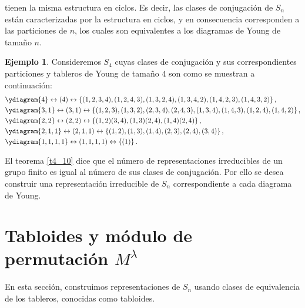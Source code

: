 \documentclass[12pt]{book}
\theoremstyle{definition}
\newtheorem{example}[theorem]{Ejemplo}
\newcounter{in}
\newcounter{ini}
\begin{document}
tienen la misma estructura en ciclos. Es decir, las clases de
conjugación de $S_{n}$ están caracterizadas por la estructura en
ciclos, y en consecuencia corresponden a las particiones de $n$, los
cuales son equivalentes a los diagramas de Young de tamaño $n$.
\begin{example}
Consideremos $S_{4}$ cuyas clases de conjugación y sus correspondientes particiones y tableros de Young de tamaño $4$ son como se muestran a continuación:
\begin{equation*}
\begin{aligned}
& \ydiagram{4}  \leftrightarrow  (4) \leftrightarrow  \left \{ (1,2,3,4),(1,2,4,3),(1,3,2,4),(1,3,4,2),(1,4,2,3),(1,4,3,2) \right \}, \\
& \ydiagram{3,1}  \leftrightarrow (3,1) \leftrightarrow  \left \{ (1,2,3),(1,3,2),(2,3,4),(2,4,3),(1,3,4),(1,4,3),(1,2,4),(1,4,2) \right \}, \\
& \ydiagram{2,2}  \leftrightarrow (2,2) \leftrightarrow  \left \{ (1,2)(3,4), (1,3)(2,4), (1,4)(2,4) \right \}, \\
& \ydiagram{2,1,1}  \leftrightarrow (2,1,1) \leftrightarrow  \left \{ (1,2),(1,3),(1,4),(2,3),(2,4),(3,4) \right \}, \\
& \ydiagram{1,1,1,1}  \leftrightarrow (1,1,1,1)  \leftrightarrow  \left \{ (1) \right \}.
\end{aligned}
\end{equation*}
\end{example}
El teorema \ref{t4_10} dice que el número de representaciones
irreducibles de un grupo finito es igual al número de sus clases de
conjugación. Por ello se desea construir una representación
irreducible de $S_{n}$ correspondiente a cada diagrama de Young.
\section{Tabloides y módulo de permutación $M^{\lambda}$}
\label{modulo-permutacion}

En esta sección, construimos representaciones de $S_{n}$ usando clases
de equivalencia de los tableros, conocidas como tabloides.
\end{document}
